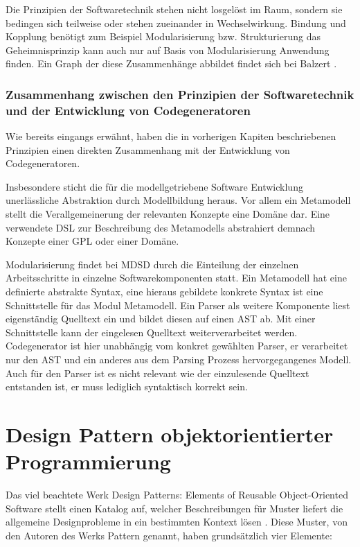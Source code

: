 \documentclass[12pt,oneside,a4paper,parskip]{scrbook}
\begin{document}
Die Prinzipien der Softwaretechnik stehen nicht losgelöst im Raum, sondern sie bedingen sich teilweise oder stehen zueinander in Wechselwirkung. Bindung und Kopplung benötigt zum Beispiel Modularisierung bzw. Strukturierung das Geheimnisprinzip kann auch nur auf Basis von Modularisierung Anwendung finden. Ein Graph der diese Zusammenhänge abbildet findet sich bei Balzert \cite[S. 49]{balzert2009a}.

\subsubsection{Zusammenhang zwischen den Prinzipien der Softwaretechnik und der Entwicklung von Codegeneratoren}

Wie bereits eingangs erwähnt, haben die in vorherigen Kapiten beschriebenen Prinzipien einen direkten Zusammenhang mit der Entwicklung von Codegeneratoren.

Insbesondere sticht die für die modellgetriebene Software Entwicklung unerlässliche Abstraktion durch Modellbildung heraus. Vor allem ein Metamodell stellt die Verallgemeinerung der relevanten Konzepte eine Domäne dar. Eine verwendete DSL zur Beschreibung des Metamodells abstrahiert demnach Konzepte einer GPL oder einer Domäne.

Modularisierung findet bei MDSD durch die Einteilung der einzelnen Arbeitsschritte in einzelne Softwarekomponenten statt. Ein Metamodell hat eine definierte abstrakte Syntax, eine hieraus gebildete konkrete Syntax ist eine Schnittstelle für das Modul Metamodell. Ein Parser als weitere Komponente liest eigenständig Quelltext ein und bildet diesen auf einen AST ab. Mit einer Schnittstelle kann der eingelesen Quelltext weiterverarbeitet werden. Codegenerator ist hier unabhängig vom konkret gewählten Parser, er verarbeitet nur den AST und ein anderes aus dem Parsing Prozess hervorgegangenes Modell. Auch für den Parser ist es nicht relevant wie der einzulesende Quelltext entstanden ist, er muss lediglich syntaktisch korrekt sein.

\section{Design Pattern objektorientierter Programmierung}

Das viel beachtete Werk Design Patterns: Elements of Reusable Object-Oriented Software stellt einen Katalog auf, welcher Beschreibungen für Muster liefert die allgemeine Designprobleme in ein bestimmten Kontext lösen \cite{gamma1995}. Diese Muster, von den Autoren des Werks Pattern genannt, haben grundsätzlich vier Elemente: 
\end{document}
